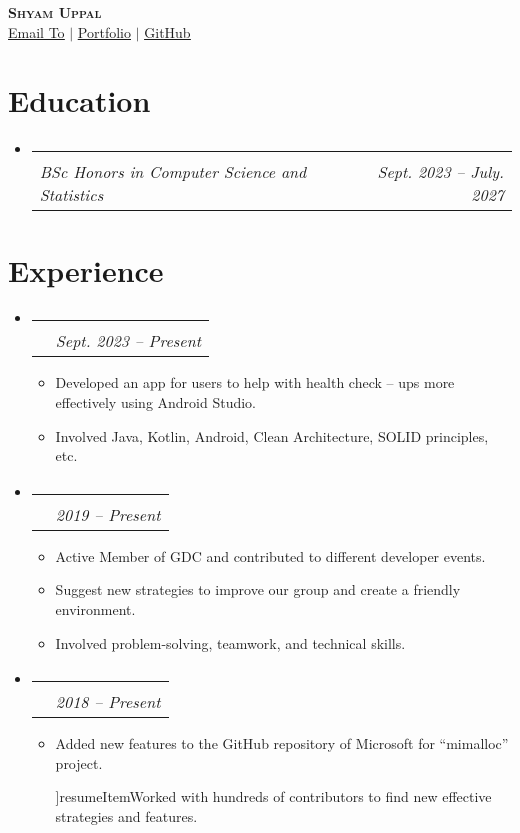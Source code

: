 \documentclass[letterpaper,11pt]{article}
\makeatletter
\newcommand{\resumeItem}[1]{
  \item\small{
    {#1 \vspace{-2pt}}
  }
}
\newcommand{\resumeSubheading}[4]{
  \vspace{-2pt}\item
    \begin{tabular*}{0.97\textwidth}[t]{l@{\extracolsep{\fill}}r}
      \textbf{#1} & #2 \\
      \textit{\small#3} & \textit{\small #4} \\
    \end{tabular*}\vspace{-7pt}
}
\newcommand{\resumeSubHeadingListStart}{\begin{itemize}[leftmargin=0.15in, label={}]}
\newcommand{\resumeSubHeadingListEnd}{\end{itemize}}
\newcommand{\resumeItemListStart}{\begin{itemize}}
\newcommand{\resumeItemListEnd}{\end{itemize}\vspace{-5pt}}
\makeatother
\begin{document}
\begin{center}
    \textbf{\Huge \scshape Shyam Uppal} \\ \vspace{1pt}
    \small \href{mailto: shyam.uppal@mail.utoronto.ca}{\underline{Email To}} $|$
    \href{}{\underline{Portfolio}} $|$
    \href{}{\underline{GitHub}}
\end{center}


\section{Education}
  \resumeSubHeadingListStart
    \resumeSubheading
      {}{}
      {BSc Honors in Computer Science and Statistics}{Sept. 2023 – July. 2027}
  \resumeSubHeadingListEnd


\section{Experience}
  \resumeSubHeadingListStart
    \resumeSubheading
      {}{ }
      {}{Sept. 2023 -- Present}
      \resumeItemListStart
        \resumeItem{Developed an app for users to help with health check – ups more effectively using Android Studio.}
        \resumeItem{Involved Java, Kotlin, Android, Clean Architecture, SOLID principles, etc.}
      \resumeItemListEnd
    \resumeSubheading
      {}{ }
      {}{2019 -- Present}
      \resumeItemListStart
        \resumeItem{Active Member of GDC and contributed to different developer events.}
        \resumeItem{Suggest new strategies to improve our group and create a friendly environment.}
        \resumeItem{Involved problem-solving, teamwork, and technical skills.}
      \resumeItemListEnd
    \resumeSubheading
      {}{}
      {}{2018 -- Present}
      \resumeItemListStart
        \resumeItem{Added new features to the GitHub repository of Microsoft for “mimalloc” project.}
        ]resumeItem{Worked with hundreds of contributors to find new effective strategies and features. }
      \resumeItemListEnd
  \resumeSubHeadingListEnd


\end{document}
